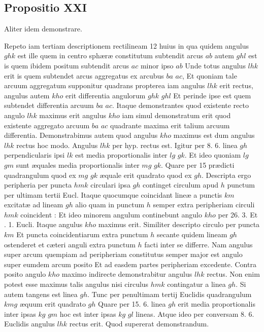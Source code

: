 \documentclass[11pt,a4paper]{article}
\begin{document}
\subsection*{Propositio XXI}

Aliter idem demonstrare.

Repeto iam tertiam descriptionem rectilineam 12 huius in qua quidem angulus $ghk$ est ille quem in centro sphæræ constitutum subtendit arcus $ab$ autem $ghl$ est is quem ibidem positum subtendit arcus $ac$ minor ipso $ab$ Unde totus angulus $lhk$ erit is quem subtendet arcus aggregatus ex arcubus $ba$ $ac$, Et quoniam tale arcuum aggregatum supponitur quadrans propterea iam angulus $lhk$ erit rectus, angulus autem $kho$ erit differentia angulorum $ghk$ $ghl$ Et perinde ipse est quem subtendet differentia arcuum $ba$ $ac$. Itaque demonstrantes quod existente recto angulo $lhk$ maximus erit angulus $kho$ iam simul demonstratum erit quod existente aggregato arcuum $ba$ $ac$ quadrante maxima erit talium arcuum differentia. Demonstrabimus autem quod angulus $kho$ maximus est dum angulus $lhk$ rectus hoc modo. Angulus $lhk$ per hyp. rectus est. Igitur per 8. 6. linea $gh$ perpendicularis ipsi $lk$ est media proportionalis inter $lg$ $gk$. Et ideo quoniam $lg$ $gm$ sunt æquales media proportionalis inter $mg$ $gk$. Quare per 15 prædicti quadrangulum quod ex $mg$ $gk$ æquale erit quadrato quod ex $gh$. Descripta ergo peripheria per puncta $hmk$ circulari ipsa $gh$ continget circulum apud $h$ punctum per ultimam tertii Eucl. Itaque quocumque coincidant lineæ a punctis $km$ excitatæ ad lineam $gh$ alio quam in punctum $h$ semper extra peripheriam circuli $hmk$ coincident : Et ideo minorem angulum continebunt angulo $kho$ per 26. 3. Et . 1. Eucli. Itaque angulus $kho$ maximus erit. Similiter descripto circulo per puncta $km$ Et puncta coincidentiarum extra punctum $h$ secante quidem lineam $gh$ ostenderet et cæteri anguli extra punctum $h$ facti inter se differre. Nam angulus super arcum quempiam ad peripheriam constitutus semper major est angulo super eumdem arcum posito Et ad easdem partes peripheriam excedente. Contra posito angulo $kho$ maximo indirecte demonstrabitur angulus $lhk$ rectus. Non enim potest esse maximus talis angulus nisi circulus $hmk$ contingatur a linea $gh$. Si autem tangens est linea $gh$. Tunc per penultimam tertij Euclidis quadrangulum $kmg$ æquum erit quadrato $gh$ Quare per 15. 6. linea $gh$ erit media proportionalis inter ipsas $kg$ $gm$ hoc est inter ipsas $kg$ $gl$ lineas. Atque ideo per conversam 8. 6. Euclidis angulus $lhk$ rectus erit. Quod supererat demonstrandum.
\end{document}
